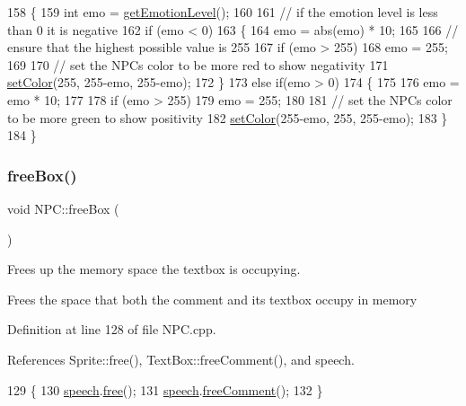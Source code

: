 \begin{DoxyCode}
158 \{
159     \textcolor{keywordtype}{int} emo = \hyperlink{class_n_p_c_a6ee0944f7b8cdf1ab5ab164b3d7074bc}{getEmotionLevel}();
160 
161     \textcolor{comment}{// if the emotion level is less than 0 it is negative}
162     \textcolor{keywordflow}{if} (emo < 0)
163     \{
164         emo = abs(emo) * 10;
165 
166         \textcolor{comment}{// ensure that the highest possible value is 255}
167         \textcolor{keywordflow}{if} (emo > 255)
168             emo = 255;
169 
170         \textcolor{comment}{// set the NPCs color to be more red to show negativity}
171         \hyperlink{class_sprite_a1ca0939610f24386a4eecb8e91688c65}{setColor}(255, 255-emo, 255-emo);
172     \}
173     \textcolor{keywordflow}{else} \textcolor{keywordflow}{if}(emo > 0)
174     \{
175 
176         emo = emo * 10;
177 
178         \textcolor{keywordflow}{if} (emo > 255)
179             emo = 255;
180 
181         \textcolor{comment}{// set the NPCs color to be more green to show positivity}
182         \hyperlink{class_sprite_a1ca0939610f24386a4eecb8e91688c65}{setColor}(255-emo, 255, 255-emo);
183     \}
184 \}
\end{DoxyCode}
\mbox{\label{class_n_p_c_abacec0f0add55305f86ad56e4c80cd18}} 
\subsubsection{\texorpdfstring{free\+Box()}{freeBox()}}
{\footnotesize\ttfamily void N\+P\+C\+::free\+Box (\begin{DoxyParamCaption}{ }\end{DoxyParamCaption})}



Frees up the memory space the textbox is occupying. 

Frees the space that both the comment and its textbox occupy in memory 

Definition at line 128 of file N\+P\+C.\+cpp.



References Sprite\+::free(), Text\+Box\+::free\+Comment(), and speech.


\begin{DoxyCode}
129 \{
130     \hyperlink{class_n_p_c_a1a1be15df827227f45559388897a9cd5}{speech}.\hyperlink{class_sprite_abce3359b4f055bac7384038046ed9ead}{free}();
131     \hyperlink{class_n_p_c_a1a1be15df827227f45559388897a9cd5}{speech}.\hyperlink{class_text_box_a6ab09c23671be63b41bd0eba32d385e3}{freeComment}();
132 \}
\end{DoxyCode}
\mbox{\label{class_n_p_c_a6e50d697a2444e3aff5bfce6252f7bb5}} 
